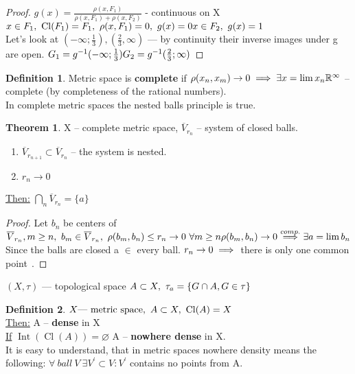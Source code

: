 \documentclass[12pt, fleqn]{article}
\theoremstyle{definition}
\newtheorem*{defn}{Definition}
\theoremstyle{break}
\newtheorem{thm}{Theorem}[section]
\theoremstyle{theorem}
\DeclareMathOperator{\clOp}{Cl}
\newcommand{\cl}[1]{\clOp({#1})}
\DeclareMathOperator{\intOp}{Int}
\newcommand{\inter}[1]{\intOp({#1})}
\begin{document}
\begin{proof}
  $g(x) = \frac{\rho(x, F_1)}{\rho(x, F_1) + \rho(x, F_2)}$ - continuous on X
  $\\x \in F_1,\ \cl{F_1} = F_1,\ \rho(x, F_1) = 0,\ g(x) = 0
  \\x \in F_2,\ g(x) = 1$
  \\Let's look at $(-\infty; \frac{1}{3}), (\frac{2}{3}, \infty)$ --- by continuity their inverse images under g are open.
  $\\G_1 = g^{-1}(-\infty; \frac{1}{3})
  \\G_2 = g^{-1}(\frac{2}{3}; \infty)\qedhere$
\end{proof}
\begin{defn}
  Metric space is \textbf{complete} if $\rho(x_n, x_m) \to 0 \implies \exists x = \lim x_n
  \\\mathbb{R}^\infty$ -- complete (by completeness of the rational numbers).
  \\In complete metric spaces the nested balls principle is true.
\end{defn}
\begin{thm}
  X -- complete metric space, $\overline{V}_{r_n}$ -- system of closed balls.
  \\\begin{enumerate}
      \item $\overline{V}_{r_{n + 1}} \subset \overline{V}_{r_n}$ -- the system is nested.
      \item $r_n \to 0$
    \end{enumerate}
  \underline{Then:} $\bigcap\limits_n \overline{V}_{r_n} = \{a\}$
\end{thm}
\begin{proof}
  Let $b_n$ be centers of $\overline{V}_{r_n},
  \\m \geq n,\ b_m \in \overline{V}_{r_n},\ \rho(b_m, b_n) \leq r_n \to 0\ \forall m \geq n
  \\\rho(b_m, b_n) \to 0 \overset{comp.}{\implies} \exists a = \lim b_n$
  Since the balls are closed a $\in$ every ball.
  $\\r_n \to 0 \implies$ there is only one common point $\qedhere$.
\end{proof}
\noindent
$(X, \tau)$ --- topological space
$\\A \subset X,\ \tau_a = \{G \cap A, G \in \tau\}$
\begin{defn}
  $X \textnormal{--- metric space},\ A \subset X,\ \cl{A} = X$
  \\\underline{Then:} A -- \textbf{dense} in X
  \\\underline{If} $\inter{\cl{A}} = \varnothing$ A -- \textbf{nowhere dense} in X.
  \\It is easy to understand, that in metric spaces nowhere density means the following: 
  $\forall\ ball\ V\ \exists V^{'} \subset V\colon V^{'}$ contains no points from A.
\end{defn}
\end{document}
